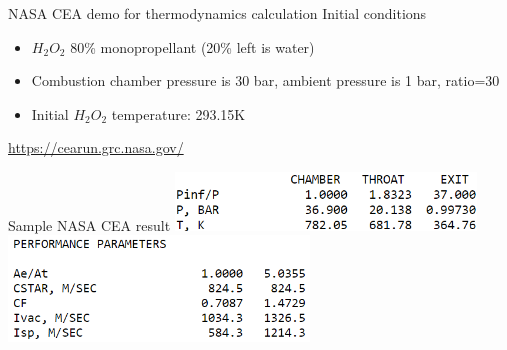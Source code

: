 \documentclass{beamer}
\begin{document}
\begin{frame}{NASA CEA demo for thermodynamics calculation}
    Initial conditions
    \begin{itemize}
        \item $H_2O_2$ 80\% monopropellant (20\% left is water)
        \item Combustion chamber pressure is 30 bar, ambient pressure is 1 bar, ratio=30
        \item Initial $H_2O_2$ temperature: 293.15K
    \end{itemize}
    \vspace{10pt}
    \centering \url{https://cearun.grc.nasa.gov/}
\end{frame}

\begin{frame}{Sample NASA CEA result}
    \centering \includegraphics[width=0.6\textwidth]{images/combustion_temperature_example_cea.png} \\
    \vspace{15pt}
    \centering \includegraphics[width=0.6\textwidth]{images/example_cea_perf_params.png} \\
\end{frame}
\end{document}
